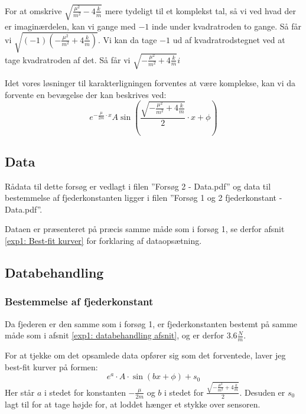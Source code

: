 For at omskrive $\sqrt{\frac{\mu^2}{m^2}-4\frac{k}{m}}$ mere tydeligt til et komplekst tal, så vi ved hvad der er imaginærdelen, kan vi gange med $-1$ inde under kvadratroden to gange. 
Så får vi $\sqrt{(-1)(-\frac{\mu^2}{m^2}+4\frac{k}{m})}$.
Vi kan da tage $-1$ ud af kvadratrodstegnet ved at tage kvadratroden af det. 
Så får vi $\sqrt{-\frac{\mu^2}{m^2}+4\frac{k}{m}}i$

Idet vores løsninger til karakterligningen forventes at være komplekse, kan vi da forvente en bevægelse der kan beskrives ved:
$$e^{-\frac{\mu}{2m} \cdot x}A\sin(\frac{\sqrt{-\frac{\mu^2}{m^2}+4\frac{k}{m}}}{2} \cdot x+\phi)$$
\subsection{Data}
Rådata til dette forsøg er vedlagt i filen ''Forsøg 2 - Data.pdf'' og data til bestemmelse af fjederkonstanten ligger i filen ''Forsøg 1 og 2 fjederkonstant - Data.pdf''. 

Dataen er præsenteret på præcis samme måde som i forsøg 1, se derfor afsnit \ref{exp1: Best-fit kurver} for forklaring af dataopsætning.



\subsection{Databehandling}
\subsubsection{Bestemmelse af fjederkonstant}
Da fjederen er den samme som i forsøg 1, er fjederkonstanten bestemt på samme måde som i afsnit \ref{exp1: databehandling afsnit}, og er derfor $3.6\frac{N}{m}$.

For at tjekke om det opsamlede data opfører sig som det forventede, laver jeg best-fit kurver på formen:
$$e^a \cdot A \cdot \sin (bx+\phi)+s_0$$
Her står $a$ i stedet for konstanten $-\frac{\mu}{2m}$ og $b$ i stedet for 
$\frac{\sqrt{-\frac{\mu^2}{m^2}+4\frac{k}{m}}}{2}$.
Desuden er $s_0$ lagt til for at tage højde for, at loddet hænger et stykke over sensoren.

